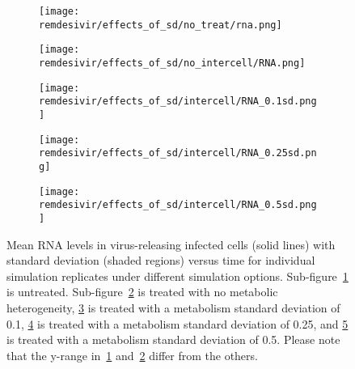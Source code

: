 \begin{figure}[H]
\centering
 \begin{subfigure}[b]{\textwidth}
    \centering
    \texttt{[image: remdesivir/effects\_of\_sd/no\_treat/rna.png]} 
    \caption{} 
    \label{fig:remdes:res:change-sd:compare:rna:notreat} 
  \end{subfigure}
    \hspace{\fill}
    \vspace{4ex}
  
  \begin{subfigure}[b]{0.48\linewidth}
    \texttt{[image: remdesivir/effects\_of\_sd/no\_intercell/RNA.png]} 
    \caption{} 
    \label{fig:remdes:res:change-sd:compare:rna:no} 
  \end{subfigure} 
  \hspace{\fill}  %
  \begin{subfigure}[b]{0.48\linewidth}
    \centering
    \texttt{[image: remdesivir/effects\_of\_sd/intercell/RNA\_0.1sd.png]} 
    \caption{} 
    \label{fig:remdes:res:change-sd:compare:rna:0.1} 
  \end{subfigure} 


    \vspace{4ex}
  \begin{subfigure}[b]{0.48\linewidth}
    \texttt{[image: remdesivir/effects\_of\_sd/intercell/RNA\_0.25sd.png]} 
    \caption{} 
    \label{fig:remdes:res:change-sd:compare:rna:0.25} 
  \end{subfigure} 
  \hspace{\fill}
   \begin{subfigure}[b]{0.48\linewidth}
    \centering
    \texttt{[image: remdesivir/effects\_of\_sd/intercell/RNA\_0.5sd.png]} 
    \caption{} 
    \label{fig:remdes:res:change-sd:compare:rna:0.5} 
  \end{subfigure} 
\caption{Mean RNA levels in virus-releasing infected cells (solid lines) with standard deviation (shaded regions) versus time for individual simulation replicates under different simulation options. Sub-figure~\ref{fig:remdes:res:change-sd:compare:rna:notreat} is untreated. Sub-figure~\ref{fig:remdes:res:change-sd:compare:rna:no} is treated with no metabolic heterogeneity, \ref{fig:remdes:res:change-sd:compare:rna:0.1} is treated with a metabolism standard deviation of 0.1, \ref{fig:remdes:res:change-sd:compare:rna:0.25} is treated with a metabolism standard deviation of 0.25, and \ref{fig:remdes:res:change-sd:compare:rna:0.5} is treated with a metabolism standard deviation of 0.5. Please note that the y-range in~\ref{fig:remdes:res:change-sd:compare:rna:notreat} and~\ref{fig:remdes:res:change-sd:compare:rna:no} differ from the others.}\label{fig:remdes:res:change-sd:compare} 
\end{figure}
